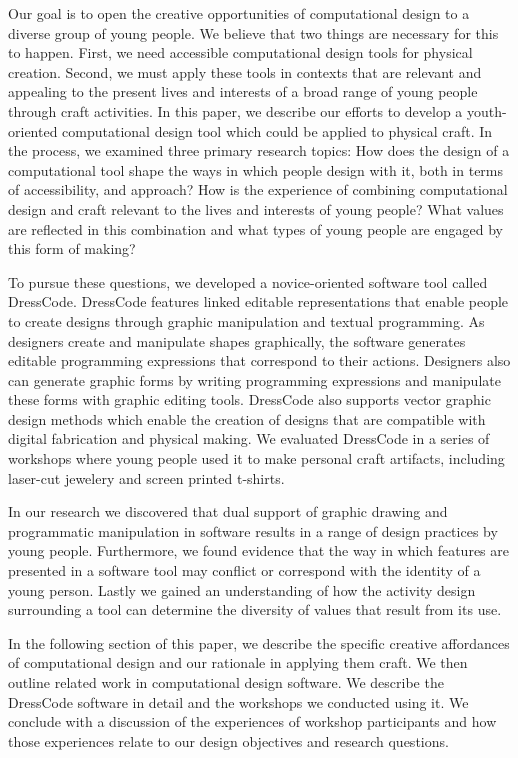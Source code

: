 \documentclass{sigchi}
\begin{document}
Our goal is to open the creative opportunities of computational design to a diverse group of young people. We believe that two things are necessary for this to happen. First, we need accessible computational design tools for physical creation. Second, we must apply these tools in contexts that are relevant and appealing to the present lives and interests of a broad range of young people through craft activities. In this paper, we describe our efforts to develop a youth-oriented computational design tool which could be applied to physical craft. In the process, we examined three primary research topics: How does the design of a computational tool shape the ways in which people design with it, both in terms of accessibility, and approach? How is the experience of combining computational design and craft relevant to the lives and interests of young people? What values are reflected in this combination and what types of young people are engaged by this form of making?
 
To pursue these questions, we developed a novice-oriented software tool called DressCode. DressCode features linked editable representations that enable people to create designs through graphic manipulation and textual programming. As designers create and manipulate shapes graphically, the software generates  editable programming expressions that correspond to their actions. Designers also can generate graphic forms by writing programming expressions and manipulate these forms with graphic editing tools. DressCode also supports vector graphic design methods which enable the creation of designs that are compatible with digital fabrication and physical making. We evaluated DressCode in a series of workshops where young people used it to make personal craft artifacts, including laser-cut jewelery and screen printed t-shirts. 

In our research we discovered that dual support of graphic drawing and programmatic manipulation in software results in a range of design practices by young people. Furthermore, we found evidence that the way in which features are presented in a software tool may conflict or correspond with the identity of a young person. Lastly we gained an understanding of how the activity design surrounding a tool can determine the diversity of values that result from its use.

In the following section of this paper, we describe the specific creative affordances of computational design and our rationale in applying them craft. We then outline related work in computational design software. We describe the DressCode software in detail and the workshops we conducted using it. We conclude with a discussion of the experiences of workshop participants and how those experiences relate to our design objectives and research questions.
\end{document}
